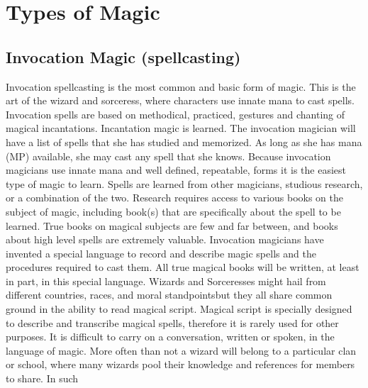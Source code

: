 \documentclass[twoside]{book}
\begin{document}
    

\section{Types of Magic}
    
    

\subsection{Invocation Magic (spellcasting)}
      Invocation spellcasting is the most common and
               basic form of magic. This is the art of the wizard and
               sorceress, where characters use innate mana to cast
               spells. Invocation spells are based on methodical,
               practiced, gestures and chanting of magical incantations.
                 Incantation magic is learned. The invocation
               magician will have a list of spells that she has studied
               and memorized. As long as she has mana (MP) available, she
               may cast any spell that she knows. Because invocation
               magicians use innate mana and well defined, repeatable,
               forms it is the easiest type of magic to learn.   Spells are learned from other magicians, studious
               research, or a combination of the two. Research requires
               access to various books on the subject of magic, including
               book(s) that are specifically about the spell to be
               learned. True books on magical subjects are few and far
               between, and books about high level spells are extremely
               valuable. Invocation magicians have invented a special
               language to record and describe magic spells and the
               procedures required to cast them. All true magical books
               will be written, at least in part, in this special
               language. Wizards and Sorceresses might hail from
               different countries, races, and moral
               standpointsbut they all share common ground in the
               ability to read magical script. Magical script is
               specially designed to describe and transcribe magical
               spells, therefore it is rarely used for other purposes. It
               is difficult to carry on a conversation, written or
               spoken, in the language of magic.   More often than not a wizard will belong to a
               particular clan or school, where many wizards pool their
               knowledge and references for members to share. In such
\end{document}
